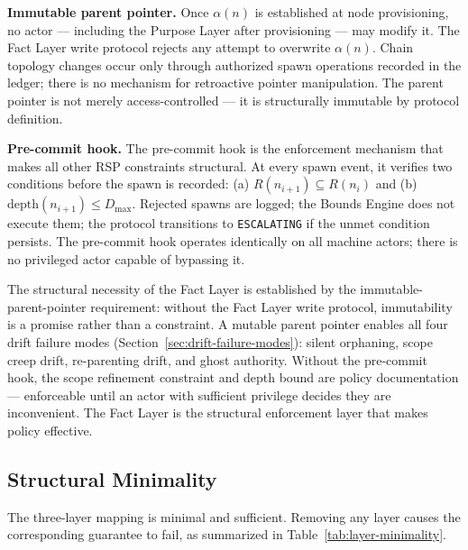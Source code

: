 \medskip
\noindent\textbf{Immutable parent pointer.} Once $\alpha(n)$ is established at node provisioning, no actor — including the Purpose Layer after provisioning — may modify it. The Fact Layer write protocol rejects any attempt to overwrite $\alpha(n)$. Chain topology changes occur only through authorized spawn operations recorded in the ledger; there is no mechanism for retroactive pointer manipulation. The parent pointer is not merely access-controlled — it is structurally immutable by protocol definition.

\medskip
\noindent\textbf{Pre-commit hook.} The pre-commit hook is the enforcement mechanism that makes all other RSP constraints structural. At every spawn event, it verifies two conditions before the spawn is recorded: (a) $R(n_{i+1}) \subseteq R(n_i)$ and (b) $\mathrm{depth}(n_{i+1}) \leq D_{\mathrm{max}}$. Rejected spawns are logged; the Bounds Engine does not execute them; the protocol transitions to \texttt{ESCALATING} if the unmet condition persists. The pre-commit hook operates identically on all machine actors; there is no privileged actor capable of bypassing it.

The structural necessity of the Fact Layer is established by the immutable-parent-pointer requirement: without the Fact Layer write protocol, immutability is a promise rather than a constraint. A mutable parent pointer enables all four drift failure modes (Section~\ref{sec:drift-failure-modes}): silent orphaning, scope creep drift, re-parenting drift, and ghost authority. Without the pre-commit hook, the scope refinement constraint and depth bound are policy documentation — enforceable until an actor with sufficient privilege decides they are inconvenient. The Fact Layer is the structural enforcement layer that makes policy effective.

\subsection{Structural Minimality}
\label{sec:rs-minimality}

The three-layer mapping is minimal and sufficient. Removing any layer causes the corresponding guarantee to fail, as summarized in Table~\ref{tab:layer-minimality}.

